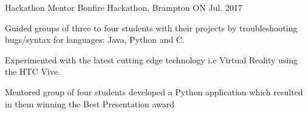 \begin{cventries}
  \cventry
    {Hackathon Mentor}
    {Bonfire Hackathon, Brampton ON}
    {}
    {Jul. 2017}
    {
      \begin{cvitems}
        \item {Guided groups of three to four students with their projects by troubleshooting bugs/syntax for languages: Java, Python and C.}
        \item {Experimented with the latest cutting edge technology i.e Virtual Reality using the HTC Vive.}
        \item {Mentored group of four students developed a Python application which resulted in them winning the Best Presentation award}
      \end{cvitems}
    }
 
\end{cventries}